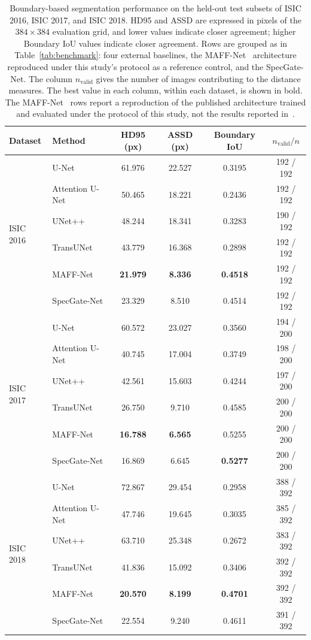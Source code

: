 \begin{table}[!t]
\centering
\caption{Boundary-based segmentation performance on the held-out test subsets of
ISIC 2016, ISIC 2017, and ISIC 2018. HD95 and ASSD are expressed in pixels of
the $384\times384$ evaluation grid, and lower values indicate closer agreement;
higher Boundary IoU values indicate closer agreement. Rows are grouped as in Table~\ref{tab:benchmark}: four external baselines, the MAFF-Net~\cite{ref15} architecture reproduced under this study's protocol as a reference control, and the SpecGate-Net. The column
$n_{\mathrm{valid}}$ gives the number of images contributing to the distance
measures. The best value in each column, within each dataset, is shown in bold. The MAFF-Net~\cite{ref15} rows report a reproduction of the published architecture trained and evaluated under the protocol of this study, not the results reported in~\cite{ref15}.}
\label{tab:boundary}
\setlength{\tabcolsep}{6pt}
\footnotesize
\begin{tabular}{llcccc}
\toprule
Dataset & Method & HD95 (px) & ASSD (px) & Boundary IoU & $n_{\mathrm{valid}}/n$ \\
\midrule
\multirow{6}{*}{ISIC 2016}
 & U-Net & 61.976 & 22.527 & 0.3195 & 192 / 192 \\
 & Attention U-Net & 50.465 & 18.221 & 0.2436 & 192 / 192 \\
 & UNet++ & 48.244 & 18.341 & 0.3283 & 190 / 192 \\
 & TransUNet & 43.779 & 16.368 & 0.2898 & 192 / 192 \\
 & MAFF-Net~\cite{ref15} & \textbf{21.979} & \textbf{8.336} & \textbf{0.4518} & 192 / 192 \\
 & SpecGate-Net & 23.329 & 8.510 & 0.4514 & 192 / 192 \\
\midrule
\multirow{6}{*}{ISIC 2017}
 & U-Net & 60.572 & 23.027 & 0.3560 & 194 / 200 \\
 & Attention U-Net & 40.745 & 17.004 & 0.3749 & 198 / 200 \\
 & UNet++ & 42.561 & 15.603 & 0.4244 & 197 / 200 \\
 & TransUNet & 26.750 & 9.710 & 0.4585 & 200 / 200 \\
 & MAFF-Net~\cite{ref15} & \textbf{16.788} & \textbf{6.565} & 0.5255 & 200 / 200 \\
 & SpecGate-Net & 16.869 & 6.645 & \textbf{0.5277} & 200 / 200 \\
\midrule
\multirow{6}{*}{ISIC 2018}
 & U-Net & 72.867 & 29.454 & 0.2958 & 388 / 392 \\
 & Attention U-Net & 47.746 & 19.645 & 0.3035 & 385 / 392 \\
 & UNet++ & 63.710 & 25.348 & 0.2672 & 383 / 392 \\
 & TransUNet & 41.836 & 15.092 & 0.3406 & 392 / 392 \\
 & MAFF-Net~\cite{ref15} & \textbf{20.570} & \textbf{8.199} & \textbf{0.4701} & 392 / 392 \\
 & SpecGate-Net & 22.554 & 9.240 & 0.4611 & 391 / 392 \\
\bottomrule
\end{tabular}
\end{table}

